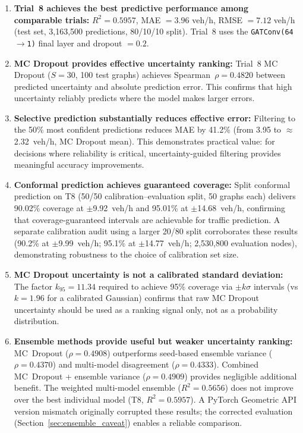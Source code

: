 \begin{enumerate}
    \item \textbf{Trial~8 achieves the best predictive performance among comparable trials:} $R^2 = 0.5957$, MAE $= 3.96$ veh/h, RMSE $= 7.12$ veh/h (test set, 3,163,500 predictions, 80/10/10 split). Trial~8 uses the \texttt{GATConv(64$\to$1)} final layer and dropout $= 0.2$.

    \item \textbf{MC Dropout provides effective uncertainty ranking:} Trial~8 MC Dropout ($S = 30$, 100 test graphs) achieves Spearman~$\rho = 0.4820$ between predicted uncertainty and absolute prediction error. This confirms that high uncertainty reliably predicts where the model makes larger errors.

    \item \textbf{Selective prediction substantially reduces effective error:} Filtering to the 50\% most confident predictions reduces MAE by 41.2\% (from 3.95 to $\approx$2.32~veh/h, MC Dropout mean). This demonstrates practical value: for decisions where reliability is critical, uncertainty-guided filtering provides meaningful accuracy improvements.

    \item \textbf{Conformal prediction achieves guaranteed coverage:} Split conformal prediction on T8 (50/50 calibration--evaluation split, 50 graphs each) delivers 90.02\% coverage at $\pm$9.92~veh/h and 95.01\% at $\pm$14.68~veh/h, confirming that coverage-guaranteed intervals are achievable for traffic prediction. A separate calibration audit using a larger 20/80 split corroborates these results (90.2\% at $\pm$9.99~veh/h; 95.1\% at $\pm$14.77~veh/h; 2,530,800 evaluation nodes), demonstrating robustness to the choice of calibration set size.

    \item \textbf{MC Dropout uncertainty is not a calibrated standard deviation:} The factor $k_{95} = 11.34$ required to achieve 95\% coverage via $\pm k\sigma$ intervals (vs $k = 1.96$ for a calibrated Gaussian) confirms that raw MC Dropout uncertainty should be used as a ranking signal only, not as a probability distribution.

    \item \textbf{Ensemble methods provide useful but weaker uncertainty ranking:} MC~Dropout ($\rho = 0.4908$) outperforms seed-based ensemble variance ($\rho = 0.4370$) and multi-model disagreement ($\rho = 0.4333$).  Combined MC~Dropout + ensemble variance ($\rho = 0.4909$) provides negligible additional benefit.  The weighted multi-model ensemble ($R^2 = 0.5656$) does not improve over the best individual model (T8, $R^2 = 0.5957$).  A PyTorch Geometric API version mismatch originally corrupted these results; the corrected evaluation (Section~\ref{sec:ensemble_caveat}) enables a reliable comparison.


\end{enumerate}
